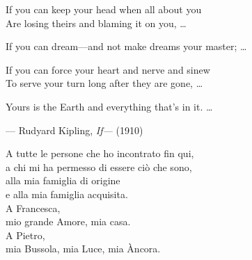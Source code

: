 \cleardoublepage
\thispagestyle{empty}

\vspace*{\fill}

\begin{flushright}
\begin{minipage}{0.58\textwidth}
\itshape

If you can keep your head when all about you\\
Are losing theirs and blaming it on you, \ldots

\vspace{0.8em}

If you can dream---and not make dreams your master; \ldots

\vspace{0.8em}

If you can force your heart and nerve and sinew\\
To serve your turn long after they are gone, \ldots

\vspace{0.8em}

Yours is the Earth and everything that's in it. \ldots

\vspace{1.5em}

\raggedleft
--- Rudyard Kipling, \textit{If---} (1910)
\end{minipage}
\end{flushright}

\vspace*{\fill}

\cleardoublepage




\cleardoublepage
\thispagestyle{empty}

\vspace*{\fill}

\begin{flushright}
\begin{minipage}{0.58\textwidth}
\itshape


A tutte le persone che ho incontrato fin qui,\\
a chi mi ha permesso di essere ciò che sono,\\
alla mia famiglia di origine\\
e alla mia famiglia acquisita.\\[0.5cm]

A Francesca,\\
mio grande Amore, mia casa.\\[0.5cm]

A Pietro,\\
mia Bussola, mia Luce, mia \`{A}ncora.


\raggedleft
\end{minipage}
\end{flushright}

\vspace*{\fill}

\cleardoublepage